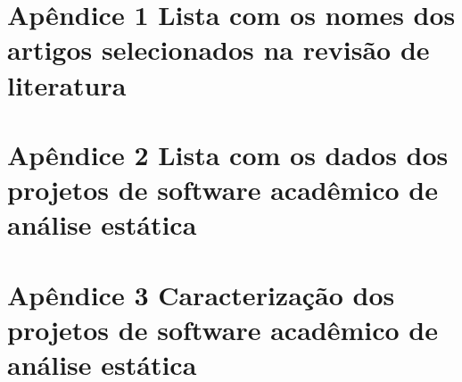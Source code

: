 \documentclass{article}
\begin{document}
\section{Apêndice 1 Lista com os nomes dos artigos selecionados na revisão de literatura}



\section{Apêndice 2 Lista com os dados dos projetos de software acadêmico de análise estática}



\section{Apêndice 3 Caracterização dos projetos de software acadêmico de análise estática}


\end{document}
